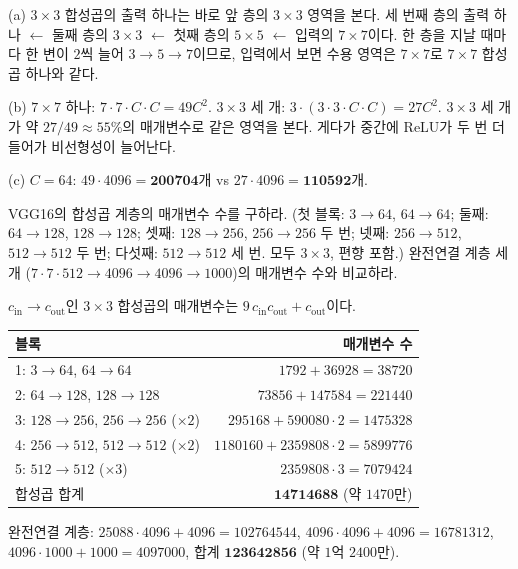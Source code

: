 \documentclass[11pt,a4paper]{article}
\begin{document}
\begin{problems}
\begin{sol}
(a) $3\times3$ 합성곱의 출력 하나는 바로 앞 층의 $3\times3$ 영역을 본다.
세 번째 층의 출력 하나 $\leftarrow$ 둘째 층의 $3\times3$ $\leftarrow$ 첫째 층의 $5\times5$ $\leftarrow$ 입력의 $7\times7$이다.
한 층을 지날 때마다 한 변이 $2$씩 늘어 $3\to5\to7$이므로, 입력에서 보면 수용 영역은 $7\times7$로 $7\times7$ 합성곱 하나와 같다.

(b) $7\times7$ 하나: $7\cdot7\cdot C\cdot C=49C^2$. \quad $3\times3$ 세 개: $3\cdot(3\cdot3\cdot C\cdot C)=27C^2$.
$3\times3$ 세 개가 약 $27/49\approx55\%$의 매개변수로 같은 영역을 본다. 게다가 중간에 ReLU가 두 번 더 들어가 비선형성이 늘어난다.

(c) $C=64$: $49\cdot4096=\mathbf{200704}$개 vs $27\cdot4096=\mathbf{110592}$개.
\end{sol}

\item VGG16의 합성곱 계층의 매개변수 수를 구하라. (첫 블록: $3\to64$, $64\to64$; 둘째: $64\to128$, $128\to128$;
셋째: $128\to256$, $256\to256$ 두 번; 넷째: $256\to512$, $512\to512$ 두 번; 다섯째: $512\to512$ 세 번. 모두 $3\times3$, 편향 포함.)
완전연결 계층 세 개 ($7\cdot7\cdot512\to4096\to4096\to1000$)의 매개변수 수와 비교하라.

\begin{sol}
$c_{\text{in}}\to c_{\text{out}}$인 $3\times3$ 합성곱의 매개변수는 $9\,c_{\text{in}}c_{\text{out}}+c_{\text{out}}$이다.
\begin{center}
\begin{tabular}{lr}
\toprule
블록 & 매개변수 수 \\
\midrule
1: $3\to64$, $64\to64$ & $1792+36928=38720$ \\
2: $64\to128$, $128\to128$ & $73856+147584=221440$ \\
3: $128\to256$, $256\to256$ ($\times2$) & $295168+590080\cdot2=1475328$ \\
4: $256\to512$, $512\to512$ ($\times2$) & $1180160+2359808\cdot2=5899776$ \\
5: $512\to512$ ($\times3$) & $2359808\cdot3=7079424$ \\
\midrule
합성곱 합계 & $\mathbf{14714688}$ (약 $1470$만) \\
\bottomrule
\end{tabular}
\end{center}
완전연결 계층: $25088\cdot4096+4096=102764544$, $4096\cdot4096+4096=16781312$, $4096\cdot1000+1000=4097000$, 합계 $\mathbf{123642856}$ (약 $1$억 $2400$만).


\end{sol}
\end{problems}
\end{document}

